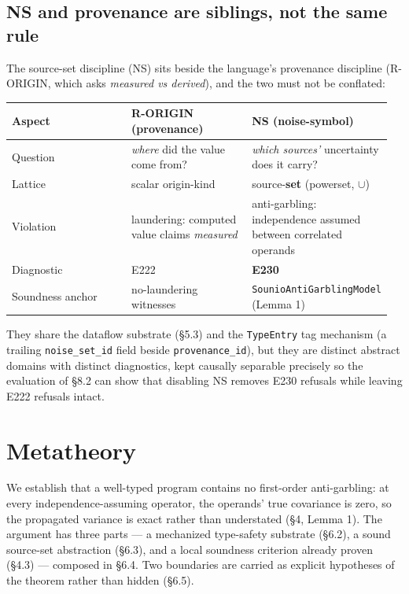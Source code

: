 \documentclass[sigplan,review,anonymous,10pt]{acmart}
\begin{document}
\subsection{NS and provenance are siblings, not the same rule}

The source-set discipline (NS) sits beside the language's provenance discipline (R-ORIGIN, which asks \emph{measured vs derived}), and the two must not be conflated:

\begin{table}[htbp]\centering\small
\begin{tabular}{p{0.32\linewidth}p{0.32\linewidth}p{0.32\linewidth}}
\toprule
Aspect & R-ORIGIN (provenance) & NS (noise-symbol) \\
\midrule
Question & \emph{where} did the value come from? & \emph{which sources'} uncertainty does it carry? \\
Lattice & scalar origin-kind & source-\textbf{set} (powerset, \texttt{$\cup$}) \\
Violation & laundering: computed value claims \emph{measured} & anti-garbling: independence assumed between correlated operands \\
Diagnostic & E222 & \textbf{E230} \\
Soundness anchor & no-laundering witnesses & \texttt{SounioAntiGarblingModel} (Lemma 1) \\
\bottomrule
\end{tabular}
\end{table}

They share the dataflow substrate (§5.3) and the \texttt{TypeEntry} tag mechanism (a trailing \texttt{noise\_set\_id} field beside \texttt{provenance\_id}), but they are distinct abstract domains with distinct diagnostics, kept causally separable precisely so the evaluation of §8.2 can show that disabling NS removes E230 refusals while leaving E222 refusals intact.

\section{Metatheory}

We establish that a well-typed program contains no first-order anti-garbling: at every independence-assuming operator, the operands' true covariance is zero, so the propagated variance is exact rather than understated (§4, Lemma 1). The argument has three parts --- a mechanized type-safety substrate (§6.2), a sound source-set abstraction (§6.3), and a local soundness criterion already proven (§4.3) --- composed in §6.4. Two boundaries are carried as explicit hypotheses of the theorem rather than hidden (§6.5).
\end{document}
